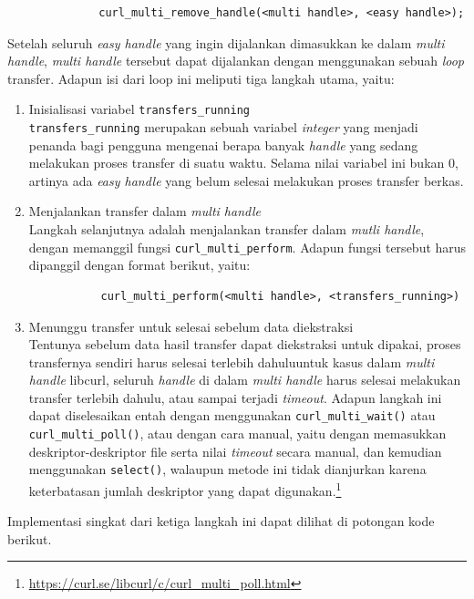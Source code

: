 \documentclass[a4paper,twoside]{article}
\begin{document}
\begin{enumerate}
\begin{verbatim}
              curl_multi_remove_handle(<multi handle>, <easy handle>);
\end{verbatim}

Setelah seluruh \textit{easy handle} yang ingin dijalankan dimasukkan ke dalam \textit{multi handle}, \textit{multi handle} tersebut dapat dijalankan dengan menggunakan sebuah \textit{loop} transfer. Adapun isi dari loop ini meliputi tiga langkah utama, yaitu:

\begin{enumerate}
	\item Inisialisasi variabel \verb|transfers_running|\\
	\verb|transfers_running| merupakan sebuah variabel \textit{integer} yang menjadi penanda bagi pengguna mengenai berapa banyak \textit{handle} yang sedang melakukan proses transfer di suatu waktu. Selama nilai variabel ini bukan 0, artinya ada \textit{easy handle} yang belum selesai melakukan proses transfer berkas.
	\item Menjalankan transfer dalam \textit{multi handle}\\
	Langkah selanjutnya adalah menjalankan transfer dalam \textit{mutli handle}, dengan memanggil fungsi \verb|curl_multi_perform|. Adapun fungsi tersebut harus dipanggil dengan format berikut, yaitu:

\begin{verbatim}
           curl_multi_perform(<multi handle>, <transfers_running>)
\end{verbatim}

	\item Menunggu transfer untuk selesai sebelum data diekstraksi\\
	Tentunya sebelum data hasil transfer dapat diekstraksi untuk dipakai, proses transfernya \linebreak sendiri harus selesai terlebih dahulu\textemdash untuk kasus dalam \textit{multi handle} libcurl, seluruh \textit{handle} di dalam \textit{multi handle} harus selesai melakukan transfer terlebih dahulu, atau sampai terjadi \textit{timeout}. Adapun langkah ini dapat diselesaikan entah dengan menggunakan \verb|curl_multi_wait()| atau \verb|curl_multi_poll()|, atau dengan cara manual, yaitu dengan memasukkan deskriptor-deskriptor file serta nilai \textit{timeout} secara manual, dan kemudian menggunakan \verb|select()|, walaupun metode ini tidak dianjurkan karena keterbatasan jumlah deskriptor yang dapat digunakan.\footnote{\href{https://curl.se/libcurl/c/curl\_multi\_poll.html}{https://curl.se/libcurl/c/curl\_multi\_poll.html}}
\end{enumerate}
\noindent
Implementasi singkat dari ketiga langkah ini dapat dilihat di potongan kode berikut.


\end{enumerate}
\end{document}
